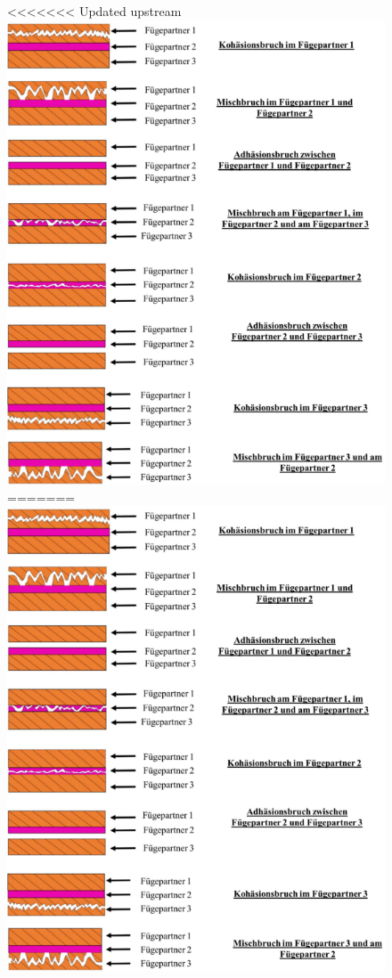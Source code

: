 \begin{figure}
    \centering
<<<<<<< Updated upstream
    \includegraphics[scale=0.4]{Bilder/Brucharten.png}
=======
    \includegraphics[scale=0.85]{Bilder/Brucharten.png}

\end{figure}
